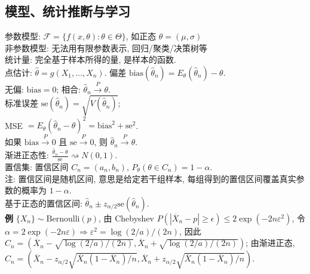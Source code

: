 \documentclass[a4paper, landscape,10pt]{article}
\begin{document}
\begin{multicols}{4}
\section{模型、统计推断与学习}
参数模型: $\mathcal{F}=\{f(x, \theta) : \theta \in \Theta\}$, 如正态 $\theta = (\mu, \sigma)$\\
非参数模型: 无法用有限参数表示, 回归/聚类/决策树等\\
统计量: 完全基于样本所得的量, 是样本的函数. \\
点估计: $\hat \theta = g(X_1, \dots, X_n)$. 
偏差 $\mathrm{bias}(\hat \theta_n) = E_\theta(\hat \theta_n) - \theta$. \\
无偏: $\mathrm{bias} = 0$; 相合: $\hat \theta_n \xrightarrow{P} \theta$. \\
标准误差 $\mathrm{se}(\hat \theta_n) = \sqrt{V(\hat \theta_n)}$; \\
MSE $ = E_\theta(\hat \theta_n - \theta)^2 = \mathrm{bias}^2 + \mathrm{se}^2$. \\
如果 $\mathrm{bias}\xrightarrow{P} 0$ 且 $\mathrm{se}\xrightarrow{P} 0$, 则 $\hat \theta_n \xrightarrow{P} \theta$. \\	
渐进正态性: $\frac{\hat\theta_n - \theta}{\mathrm{se}} \rightsquigarrow N(0, 1).$ \\
置信集: 置信区间 $C_n = (a_n, b_n)$, $P_\theta(\theta \in C_n) = 1 - \alpha$. \\
注: 置信区间是随机区间, 意思是给定若干组样本, 每组得到的置信区间覆盖真实参数的概率为 $1 - \alpha$. \\
基于正态的置信区间: $\hat \theta_n \pm z_{\alpha/2} \mathrm{se}(\hat \theta_n)$. \\
{\bfseries 例} $\{X_n\} \sim \mathrm{Bernoulli}(p)$, 
由 Chebyshev $P(|\overline X_n - p| \geq \epsilon) \leq 2 \exp(-2n\varepsilon^2)$, 令 $\alpha= 2\exp(-2n\varepsilon) \Rightarrow \varepsilon ^ 2 = \log(2/a)/(2n)$, 因此 $C_n = (\overline X_n - \sqrt{\log(2/a)/(2n)}, \overline X_n + \sqrt{\log(2/a)/(2n)})$;
由渐进正态, $C_n =(\overline X_n - z_{\alpha/2} \sqrt{\overline X_n(1 - \overline X_n)/n}, \overline X_n + z_{\alpha/2} \sqrt{\overline X_n(1 - \overline X_n)/n})$. \\

\end{multicols}
\newpage
\end{document}
